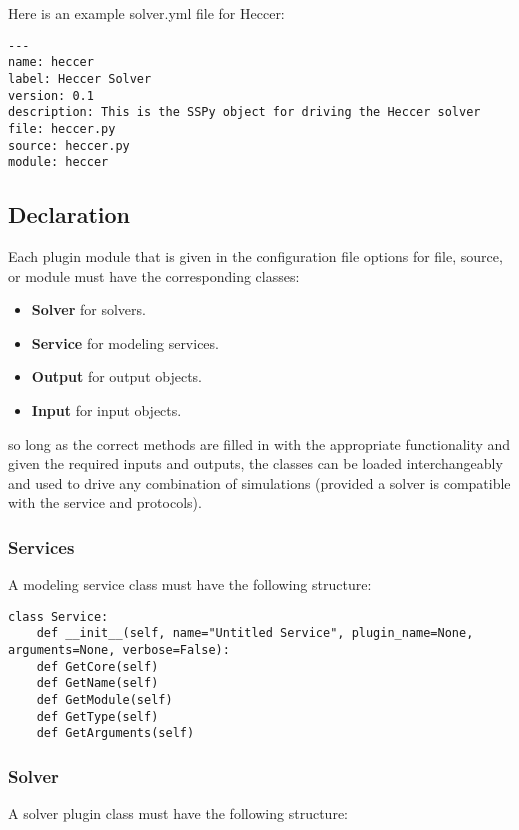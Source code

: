 \documentclass[12pt]{article}
\begin{document}
Here is an example solver.yml file for Heccer:

\begin{verbatim}
---
name: heccer
label: Heccer Solver
version: 0.1
description: This is the SSPy object for driving the Heccer solver
file: heccer.py
source: heccer.py
module: heccer
\end{verbatim}


\subsection*{Declaration}

Each plugin module that is given in the configuration file options for file, source, or module must have the corresponding classes:

\begin{itemize}
	\item[] {\bf Solver} for solvers.
	\item[] {\bf Service} for modeling services.
	\item[] {\bf Output} for output objects.
	\item[] {\bf Input} for input objects.
\end{itemize}

so long as the correct methods are filled in with the appropriate functionality and given the required inputs and outputs,  the classes can be loaded interchangeably and used to drive any combination of simulations (provided a solver is compatible with the service and protocols). 

\subsubsection*{Services}

A modeling service class must have the following structure:

\begin{verbatim}
class Service:
	def __init__(self, name="Untitled Service", plugin_name=None, arguments=None, verbose=False):
	def GetCore(self)
	def GetName(self)
	def GetModule(self)
	def GetType(self)
	def GetArguments(self)
\end{verbatim}

\subsubsection*{Solver}

A solver plugin class must have the following structure:
\end{document}
